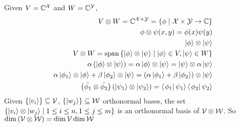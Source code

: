 \begin{definition}
    Given $V = \mathbb{C}^{\mathcal{X}}$ and $W = \mathbb{C}^{\mathcal{Y}}$,
    \begin{align*}
        V \otimes W = \mathbb{C}^{\mathcal{X} \times \mathcal{Y}} = \left\lbrace\phi \mid \mathcal{X} \times \mathcal{Y} \to \mathbb{C}\right\rbrace                    \\
        \phi \otimes \psi(x, y) = \phi(x)\psi(y)                                                                                                                  \\
        \left|\phi\right\rangle\otimes\left|\psi\right\rangle                                                                                                                               \\
        V \otimes W = \operatorname{span}\left\lbrace\left|\phi\right\rangle \otimes \left|\psi\right\rangle \mid \left|\phi\right\rangle \in V, \left|\psi\right\rangle \in W\right\rbrace                                                \\
        \alpha\left(\left|\phi\right\rangle\otimes\left|\psi\right\rangle\right) = \alpha\left|\phi\right\rangle\otimes\left|\psi\right\rangle = \left|\psi\right\rangle\otimes\alpha\left|\psi\right\rangle                            \\
        \alpha\left|\phi_1\right\rangle\otimes \left|\phi\right\rangle + \beta\left|\phi_2\right\rangle\otimes\left|\psi\right\rangle = \left(\alpha\left|\phi_1\right\rangle + \beta\left|\phi_2\right\rangle\right)\otimes \left|\psi\right\rangle \\
        \left(\bar{\phi_1}\otimes\bar{\phi_2}\right)\left(\left|\psi_1\right\rangle\otimes\left|\psi_2\right\rangle\right) = \left\langle \left.\phi_1\right|\psi_1\right\rangle\left\langle \left.\phi_2\right|\psi_2\right\rangle
    \end{align*}
    Given $\left\lbrace\left|v_i\right\rangle\right\rbrace \subseteq \mathcal{V}$, $\left\lbrace\left|w_j\right\rangle\right\rbrace\subseteq\mathcal{W}$ orthonormal bases,
    the set $\left\lbrace\left|v_i\right\rangle\otimes\left|w_j\right\rangle \mid 1 \leq i \leq n, 1 \leq j \leq m\right\rbrace$ is an orthonormal basis
    of $\mathcal{V} \otimes \mathcal{W}$. So $\dim\left(\mathcal{V} \otimes \mathcal{W}\right) = \dim\mathcal{V}\dim\mathcal{W}$
\end{definition}

